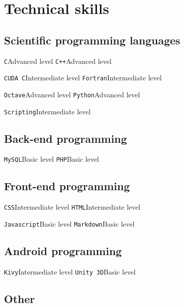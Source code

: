 \documentclass[11pt,a4paper,sans]{moderncv}        %
\begin{document}
\section{Technical skills}

\subsection{Scientific programming languages}

\cvdoubleitem
{\texttt{C}}{Advanced level}
{\texttt{C++}}{Advanced level}

\cvdoubleitem
{\texttt{CUDA C}}{Intermediate level}
{\texttt{Fortran}}{Intermediate level}

\cvdoubleitem
{\texttt{Octave}}{Advanced level} 
{\texttt{Python}}{Advanced level}

\cvitem
{\texttt{Scripting}}{Intermediate level}

\subsection{Back-end programming}
\cvdoubleitem
{\texttt{MySQL}}{Basic level}
{\texttt{PHP}}{Basic level}

\subsection{Front-end programming}
\cvdoubleitem
{\texttt{CSS}}{Intermediate level}
{\texttt{HTML}}{Intermediate level}

\cvdoubleitem
{\texttt{Javascript}}{Basic level}
{\texttt{Markdown}}{Basic level}

\subsection{Android programming}
\cvdoubleitem
{\texttt{Kivy}}{Intermediate level}
{\texttt{Unity 3D}}{Basic level}

\subsection{Other}

\end{document}
